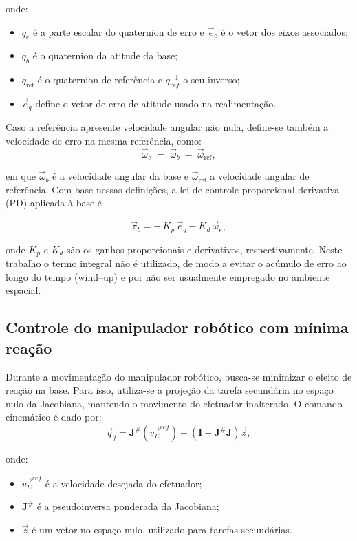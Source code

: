 onde:
\begin{itemize}
    \item $q_{e}$ é a parte escalar do quaternion de erro e $\vec {\epsilon}_e$ é o vetor dos eixos associados;
    \item $q_b$ é o quaternion da atitude da base;
    \item $q_{\mathrm{ref}}$ é o quaternion de referência e $q_{ref}^{-1}$ o seu inverso;
    \item $\vec e_q$ define o vetor de erro de atitude usado na realimentação.
\end{itemize}


Caso a referência apresente velocidade angular não nula, define-se também a velocidade de erro na mesma referência, como:
\begin{equation}
    \vec{\omega}_e \;=\; \vec{\omega}_b \;-\; \vec{\omega}_{\mathrm{ref}},
    \label{eq:erro_velocidade}
\end{equation}

em que $\vec{\omega}_b$ é a velocidade angular da base e $\vec{\omega}_{\mathrm{ref}}$ a velocidade angular de referência.
Com base nessas definições, a lei de controle proporcional-derivativa (PD) aplicada à base é

\begin{equation}
    \vec{\tau}_b=
    -\,K_p\,\vec e_q
    -K_d\,\vec\omega_e,
    \label{eq:lei_controle_PD}
\end{equation}

onde $K_p$ e $K_d$ são os ganhos proporcionais e derivativos, respectivamente. 
Neste trabalho o termo integral não é utilizado, de modo a evitar o acúmulo de erro ao longo do tempo (wind--up) 
e por não ser usualmente empregado no ambiente espacial.


\subsection{Controle do manipulador robótico com mínima reação}
Durante a movimentação do manipulador robótico, busca-se minimizar o efeito de reação na base.
Para isso, utiliza-se a projeção da tarefa secundária no espaço nulo da Jacobiana, mantendo o movimento do efetuador inalterado. O comando cinemático é dado por:
\begin{equation}
    \dot{\vec{q}}_j = \mathbf{J}^\# (\vec{v_E}^{ref}) +
    \left( \mathbf{I}
    -\mathbf{J}^\# \mathbf{J} \right)
    \vec{z},
\end{equation}

onde:
\begin{itemize}
    \item $ \vec{v_E}^{ref} $ é a velocidade desejada do efetuador;
    \item $ \mathbf{J}^\# $ é a pseudoinversa ponderada da Jacobiana;
    \item $ \vec{z} $ é um vetor no espaço nulo, utilizado para tarefas secundárias.
\end{itemize}

